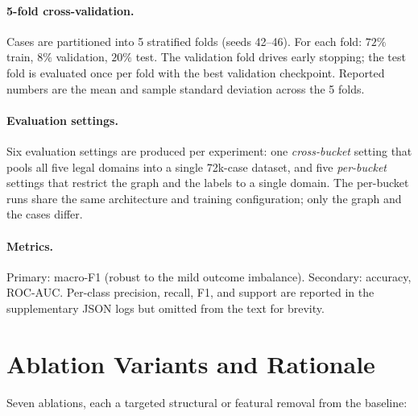 \paragraph{5-fold cross-validation.} Cases are partitioned into 5
stratified folds (seeds 42--46). For each fold: $72\%$ train,
$8\%$ validation, $20\%$ test. The validation fold drives early
stopping; the test fold is evaluated once per fold with the best
validation checkpoint. Reported numbers are the mean and sample
standard deviation across the 5 folds.

\paragraph{Evaluation settings.} Six evaluation settings are produced
per experiment: one \emph{cross-bucket} setting that pools all five
legal domains into a single 72k-case dataset, and five
\emph{per-bucket} settings that restrict the graph and the labels to
a single domain. The per-bucket runs share the same architecture and
training configuration; only the graph and the cases differ.

\paragraph{Metrics.} Primary: macro-F1 (robust to the mild outcome
imbalance). Secondary: accuracy, ROC-AUC. Per-class precision,
recall, F1, and support are reported in the supplementary JSON logs
but omitted from the text for brevity.

\section{Ablation Variants and Rationale}

Seven ablations, each a targeted structural or featural removal from
the baseline:

